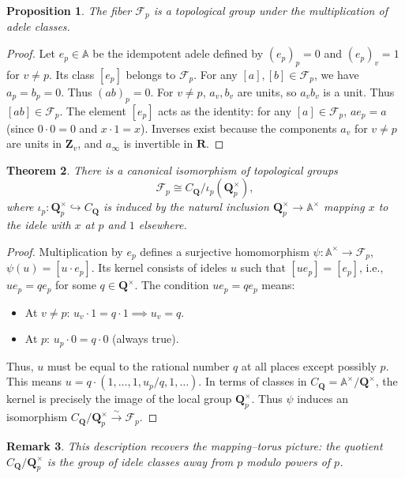 \documentclass[11pt,a4paper]{article}
\newcommand{\Q}{\mathbf{Q}}
\newcommand{\Z}{\mathbf{Z}}
\newcommand{\R}{\mathbf{R}}
\newcommand{\A}{\mathbb{A}}
\theoremstyle{plain}
\newtheorem{thm}{Theorem}[section]
\newtheorem{prop}[thm]{Proposition}
\newtheorem{rem}[thm]{Remark}
\theoremstyle{definition} %
\begin{document}
\begin{prop}
The fiber $\mathcal{F}_p$ is a topological group under the multiplication of adele classes.
\end{prop}

\begin{proof}
Let $e_p \in \A$ be the idempotent adele defined by $(e_p)_p = 0$ and $(e_p)_v = 1$ for $v \neq p$. Its class $[e_p]$ belongs to $\mathcal{F}_p$.
For any $[a], [b] \in \mathcal{F}_p$, we have $a_p = b_p = 0$. Thus $(ab)_p = 0$.
For $v \neq p$, $a_v, b_v$ are units, so $a_v b_v$ is a unit.
Thus $[ab] \in \mathcal{F}_p$.
The element $[e_p]$ acts as the identity: for any $[a] \in \mathcal{F}_p$, $a e_p = a$ (since $0 \cdot 0 = 0$ and $x \cdot 1 = x$).
Inverses exist because the components $a_v$ for $v \neq p$ are units in $\Z_v$, and $a_\infty$ is invertible in $\R$.
\end{proof}

\begin{thm}
There is a canonical isomorphism of topological groups
\[
\mathcal{F}_p \cong C_\Q / \iota_p(\Q_p^\times),
\]
where $\iota_p: \Q_p^\times \hookrightarrow C_\Q$ is induced by the natural inclusion $\Q_p^\times \to \A^\times$ mapping $x$ to the idele with $x$ at $p$ and $1$ elsewhere.
\end{thm}

\begin{proof}
Multiplication by $e_p$ defines a surjective homomorphism
$\psi : \A^\times \to \mathcal{F}_p$, $\psi(u) = [u \cdot e_p]$.
Its kernel consists of ideles $u$ such that $[u e_p] = [e_p]$, i.e., $u e_p = q e_p$ for some $q \in \Q^\times$. The condition $u e_p = q e_p$ means:
\begin{itemize}
    \item[] At $v \neq p$: $u_v \cdot 1 = q \cdot 1 \implies u_v = q$.
    \item[] At $p$: $u_p \cdot 0 = q \cdot 0$ (always true).
\end{itemize}
Thus, $u$ must be equal to the rational number $q$ at all places except possibly $p$.
This means $u = q \cdot (1, \dots, 1, u_p/q, 1, \dots)$.
In terms of classes in $C_\Q = \A^\times / \Q^\times$, the kernel is precisely the image of the local group $\Q_p^\times$.
Thus $\psi$ induces an isomorphism $C_\Q / \Q_p^\times \xrightarrow{\sim} \mathcal{F}_p$.
\end{proof}

\begin{rem}
This description recovers the mapping--torus picture:
the quotient $C_\Q / \Q_p^\times$ is the group of idele classes away from $p$ modulo powers of $p$. 
\end{rem}
\end{document}
